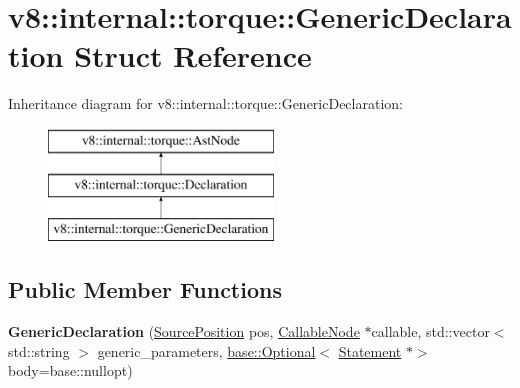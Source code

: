 \hypertarget{structv8_1_1internal_1_1torque_1_1GenericDeclaration}{}\section{v8\+:\+:internal\+:\+:torque\+:\+:Generic\+Declaration Struct Reference}
\label{structv8_1_1internal_1_1torque_1_1GenericDeclaration}
Inheritance diagram for v8\+:\+:internal\+:\+:torque\+:\+:Generic\+Declaration\+:\begin{figure}[H]
\begin{center}
\leavevmode
\includegraphics[height=3.000000cm]{structv8_1_1internal_1_1torque_1_1GenericDeclaration}
\end{center}
\end{figure}
\subsection*{Public Member Functions}
\begin{DoxyCompactItemize}
\item 
\mbox{\label{structv8_1_1internal_1_1torque_1_1GenericDeclaration_aa5a2171c57dd845ff7cc501df387897f}} 
{\bfseries Generic\+Declaration} (\mbox{\hyperlink{structv8_1_1internal_1_1torque_1_1SourcePosition}{Source\+Position}} pos, \mbox{\hyperlink{structv8_1_1internal_1_1torque_1_1CallableNode}{Callable\+Node}} $\ast$callable, std\+::vector$<$ std\+::string $>$ generic\+\_\+parameters, \mbox{\hyperlink{classv8_1_1base_1_1Optional}{base\+::\+Optional}}$<$ \mbox{\hyperlink{structv8_1_1internal_1_1torque_1_1Statement}{Statement}} $\ast$$>$ body=base\+::nullopt)
\end{DoxyCompactItemize}
